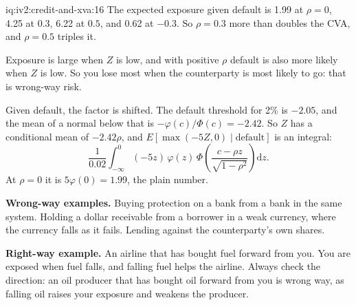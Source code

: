 \begin{solution}{iq:iv2:credit-and-xva:16}
The expected exposure given default is 1.99 at $\rho = 0$, 4.25 at $0.3$, 6.22 at $0.5$, and 0.62 at $-0.3$. So $\rho = 0.3$ more than doubles the CVA, and $\rho = 0.5$ triples it.

Exposure is large when $Z$ is low, and with positive $\rho$ default is also more likely when $Z$ is low. So you lose most when the counterparty is most likely to go: that is wrong-way risk.

Given default, the factor is shifted. The default threshold for 2\% is $-2.05$, and the mean of a normal below that is $-\varphi(c)/\Phi(c) = -2.42$. So $Z$ has a conditional mean of $-2.42\rho$, and $E[\max(-5Z, 0) \mid \text{default}]$ is an integral:
\[
\frac{1}{0.02}\int_{-\infty}^{0} (-5z)\,\varphi(z)\,\Phi\!\left(\frac{c - \rho z}{\sqrt{1 - \rho^2}}\right)\mathrm{d}z.
\]
At $\rho = 0$ it is $5\varphi(0) = 1.99$, the plain number.

\textbf{Wrong-way examples.} Buying protection on a bank from a bank in the same system. Holding a dollar receivable from a borrower in a weak currency, where the currency falls as it fails. Lending against the counterparty's own shares.

\textbf{Right-way example.} An airline that has bought fuel forward from you. You are exposed when fuel falls, and falling fuel helps the airline. Always check the direction: an oil producer that has bought oil forward from you is wrong way, as falling oil raises your exposure and weakens the producer.

\end{solution}

